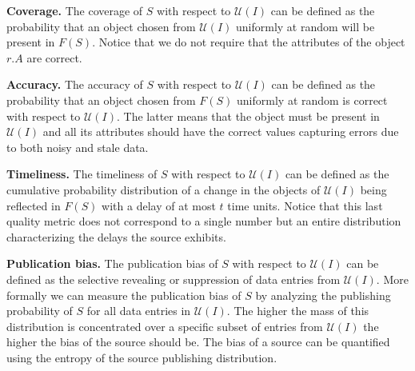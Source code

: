 \documentclass{sig-alternate}
\begin{document}
\vspace{5pt}\noindent\textbf{Coverage.} The coverage of $S$ with respect to $\mathcal{U}(I)$ can be defined as the probability that an object chosen from $\mathcal{U}(I)$ uniformly at random will be present in $F(S)$. Notice that we do not require that the attributes of the object $r.A$ are correct.

\vspace{5pt}\noindent\textbf{Accuracy.} The accuracy of $S$ with respect to $\mathcal{U}(I)$ can be defined as the probability that an object chosen from $F(S)$ uniformly at random is correct with respect to $\mathcal{U}(I)$. The latter means that the object must be present in $\mathcal{U}(I)$ and all its attributes should have the correct values capturing errors due to both noisy and stale data.

\vspace{5pt}\noindent\textbf{Timeliness.} The timeliness of $S$ with respect to $\mathcal{U}(I)$ can be defined as the cumulative probability distribution of a change in the objects of $\mathcal{U}(I)$ being reflected in $F(S)$ with a delay of at most $t$ time units. Notice that this last quality metric does not correspond to a single number but an entire distribution characterizing the delays the source exhibits.

\vspace{5pt}\noindent\textbf{Publication bias.} The publication bias of $S$ with respect to $\mathcal{U}(I)$ can be defined as the selective revealing or suppression of data entries from $\mathcal{U}(I)$. More formally we can measure the publication bias of $S$ by analyzing the publishing probability of $S$ for all data entries in $\mathcal{U}(I)$. The higher the mass of this distribution is concentrated over a specific subset of entries from $\mathcal{U}(I)$ the higher the bias of the source should be. The bias of a source can be quantified using the entropy of the source publishing distribution.
\end{document}
